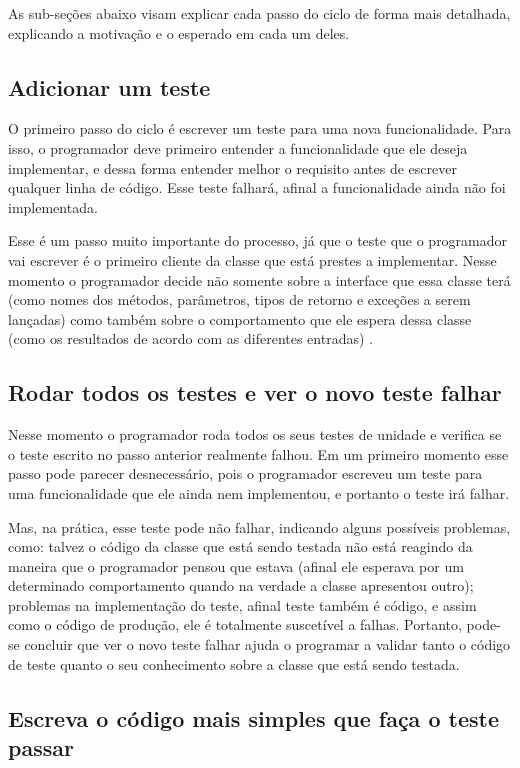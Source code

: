 As sub-seções abaixo visam explicar cada passo do ciclo de forma mais detalhada, explicando a motivação e o esperado 
em cada um deles.

\subsection{Adicionar um teste}

O primeiro passo do ciclo é escrever um teste para uma nova funcionalidade. Para isso, o programador deve primeiro entender a funcionalidade 
que ele deseja implementar, e dessa forma entender melhor o requisito antes de escrever qualquer linha de código.
Esse teste falhará, afinal a funcionalidade ainda não foi implementada. 

Esse é um passo muito importante do processo, já que o teste que o programador vai escrever é o primeiro cliente da classe que está
prestes a implementar. Nesse momento o programador decide não somente sobre a interface que essa classe terá (como nomes dos métodos,
parâmetros, tipos de retorno e exceções a serem lançadas) como também sobre o comportamento que ele espera dessa classe (como 
os resultados de acordo com as diferentes entradas) \cite{GOOS}.

\subsection{Rodar todos os testes e ver o novo teste falhar}

Nesse momento o programador roda todos os seus testes de unidade e verifica se o teste escrito no passo anterior realmente falhou. Em um
primeiro momento esse passo pode parecer desnecessário, pois o programador escreveu um teste para uma funcionalidade que ele ainda nem
implementou, e portanto o teste irá falhar. 

Mas, na prática, esse teste pode não falhar, indicando alguns possíveis problemas, como: talvez o código da classe que está sendo testada
não está reagindo da maneira que o programador pensou que estava (afinal ele esperava por um determinado comportamento quando na verdade a
classe apresentou outro); problemas na implementação do teste, afinal teste também é código, e assim como o código de produção, ele é
totalmente suscetível a falhas.
Portanto, pode-se concluir que ver o novo teste falhar ajuda o programar a validar tanto o código de teste quanto o seu conhecimento
sobre a classe que está sendo testada. 

\subsection{Escreva o código mais simples que faça o teste passar}

